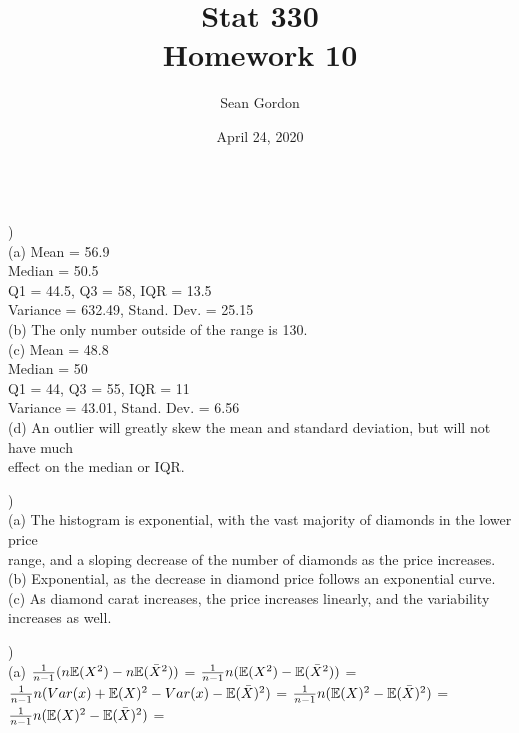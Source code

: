 \documentclass[12pt]{article}
\title{Stat 330\\Homework 10}
\author{Sean Gordon}
\date{April 24, 2020}
\begin{document}
\maketitle


\noindent\hrulefill \\[-.8em]


)\\
\indent (a) Mean = 56.9\\
\indent \indent Median = 50.5\\
\indent \indent Q1 = 44.5, Q3 = 58, IQR = 13.5\\
\indent \indent Variance = 632.49, Stand. Dev. = 25.15\\

\indent (b) The only number outside of the range is 130.\\

\indent (c) Mean = 48.8\\
\indent \indent Median = 50\\
\indent \indent Q1 = 44, Q3 = 55, IQR = 11\\
\indent \indent Variance = 43.01, Stand. Dev. = 6.56\\

\indent (d) An outlier will greatly skew the mean and standard deviation, but will not have much\\
\indent \indent effect on the median or IQR.\\


\noindent \hrulefill 


)\\
\indent (a) The histogram is exponential, with the vast majority of diamonds in the lower price \\
\indent \indent range, and a sloping decrease of the number of diamonds as the price increases.\\

\indent (b) Exponential, as the decrease in diamond price follows an exponential curve.\\

\indent (c) As diamond carat increases, the price increases linearly, and the variability \\
\indent \indent increases as well.\\


\noindent \hrulefill 
\pagebreak


)\\
\indent (a) ${\Large \frac{1}{n-1}}(n\mathbb{E}(X^2) - n\mathbb{E}(\bar{X}^2))$ = ${\Large \frac{1}{n-1}}n(\mathbb{E}(X^2) - \mathbb{E}(\bar{X}^2))$ = \\[.4em]
\indent \indent ${\Large \frac{1}{n-1}}n(Var(x) + \mathbb{E}(X)^2 - Var(x) - \mathbb{E}(\bar{X})^2)$ = ${\Large \frac{1}{n-1}}n(\mathbb{E}(X)^2 - \mathbb{E}(\bar{X})^2)$ = \\[.4em]
\indent \indent ${\Large \frac{1}{n-1}}n(\mathbb{E}(X)^2 - \mathbb{E}(\bar{X})^2)$ = \\
\end{document}
